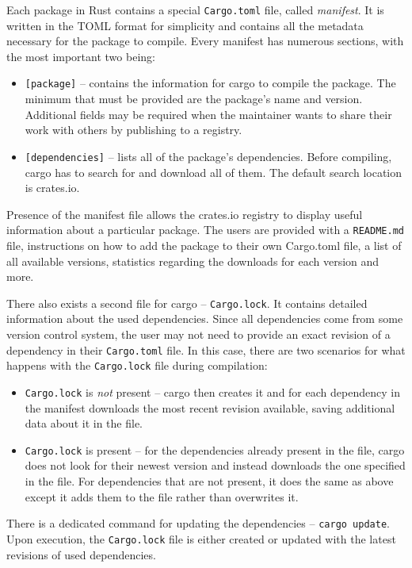 \documentclass[licencjacka,en]{pracamgr}
\begin{document}
Each package in Rust contains a special \texttt{Cargo.toml} file, called \textit{manifest}. It is
written in the TOML format for simplicity and contains all the metadata necessary for the package
to compile. Every manifest has numerous sections, with the most important two being:
\begin{itemize}
	\item \texttt{[package]} -- contains the information for cargo to compile the package.
		The minimum that must be provided are the package's name and version. Additional fields
		may be required when the maintainer wants to share their work with others by publishing
		to a registry.
	\item \texttt{[dependencies]} -- lists all of the package's dependencies. Before compiling,
		cargo has to search for and download all of them. The default search location is crates.io.
\end{itemize}
Presence of the manifest file allows the crates.io registry to display useful information about
a particular package. The users are provided with a \texttt{README.md} file, instructions on how
to add the package to their own Cargo.toml file, a list of all available versions, statistics
regarding the downloads for each version and more.

There also exists a second file for cargo -- \texttt{Cargo.lock}. It contains detailed
information about the used dependencies. Since all dependencies come from some version control
system, the user may not need to provide an exact revision of a dependency in their
\texttt{Cargo.toml} file. In this case, there are two scenarios for what happens with the
\texttt{Cargo.lock} file during compilation:
\begin{itemize}
	\item \texttt{Cargo.lock} is \textit{not} present -- cargo then creates it and for each
		dependency in the manifest downloads the most recent revision available, saving additional
		data about it in the file.
	\item \texttt{Cargo.lock} is present -- for the dependencies already present in the file, cargo
		does not look for their newest version and instead downloads the one specified in the file.
		For dependencies that are not present, it does the same as above except it adds them to
		the file rather than overwrites it.
\end{itemize}
There is a dedicated command for updating the dependencies -- \texttt{cargo update}.
Upon execution, the \texttt{Cargo.lock} file is either created or updated with the latest
revisions of used dependencies.
\end{document}
